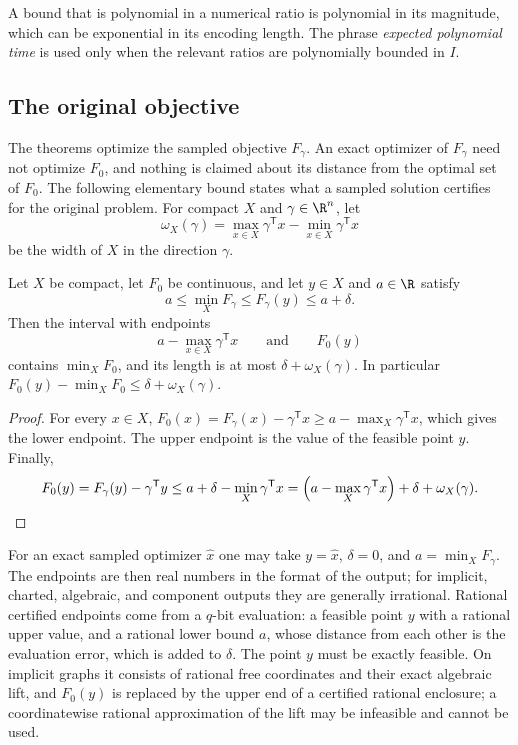 A bound that is polynomial in a numerical ratio is polynomial in its
magnitude, which can be exponential in its encoding length. The phrase
\emph{expected polynomial time} is used only when the relevant ratios are
polynomially bounded in $I$.

\subsection{The original objective}\label{sec:model:original}

The theorems optimize the sampled objective $F_\gamma$. An exact optimizer
of $F_\gamma$ need not optimize $F_0$, and nothing is claimed about its
distance from the optimal set of $F_0$. The following elementary bound states
what a sampled solution certifies for the original problem. For compact $X$
and $\gamma\in\R^n$, let
\[
 \omega_X(\gamma)=\max_{x\in X}\gamma^{\mathsf T}x-\min_{x\in X}\gamma^{\mathsf T}x
\]
be the width of $X$ in the direction $\gamma$.

\begin{proposition}\label{prop:model:regret}
Let $X$ be compact, let $F_0$ be continuous, and let $y\in X$ and $a\in\R$
satisfy
\[
 a\le\min_XF_\gamma\le F_\gamma(y)\le a+\delta.
\]
Then the interval with endpoints
\[
 a-\max_{x\in X}\gamma^{\mathsf T}x\qquad\text{and}\qquad F_0(y)
\]
contains $\min_XF_0$, and its length is at most $\delta+\omega_X(\gamma)$. In
particular $F_0(y)-\min_XF_0\le\delta+\omega_X(\gamma)$.
\end{proposition}

\begin{proof}
For every $x\in X$, $F_0(x)=F_\gamma(x)-\gamma^{\mathsf T}x\ge
a-\max_X\gamma^{\mathsf T}x$, which gives the lower endpoint. The upper
endpoint is the value of the feasible point $y$. Finally,
\[
 F_0(y)=F_\gamma(y)-\gamma^{\mathsf T}y\le a+\delta-\min_X\gamma^{\mathsf T}x
 =\Bigl(a-\max_X\gamma^{\mathsf T}x\Bigr)+\delta+\omega_X(\gamma).\qedhere
\]
\end{proof}

For an exact sampled optimizer $\hat x$ one may take $y=\hat x$, $\delta=0$,
and $a=\min_XF_\gamma$. The endpoints are then real numbers in the format of
the output; for implicit, charted, algebraic, and component outputs they
are generally irrational. Rational certified endpoints come from a
$q$-bit evaluation: a feasible point $y$ with a rational upper value, and a
rational lower bound $a$, whose distance from each other is the evaluation
error, which is added to $\delta$. The point $y$ must be exactly feasible.
On implicit graphs it consists of rational free coordinates and their exact
algebraic lift, and $F_0(y)$ is replaced by the upper end of a certified
rational enclosure; a coordinatewise rational approximation of the lift may
be infeasible and cannot be used.

